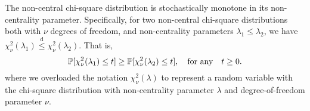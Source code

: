 \begin{lemma} \label{lemma:stochastic-monotonicity}
The non-central chi-square distribution is stochastically monotone in its non-centrality parameter.
Specifically, for two non-central chi-square distributions both with $\nu$ degrees of freedom, and non-centrality parameters $\lambda_1 \le \lambda_2$, we have $\chi^2_\nu(\lambda_1) \stackrel{\mathrm{d}}{\le} \chi^2_\nu(\lambda_2)$. 
That is,
\begin{equation} \label{eq:stochastic-monotonicity}
    \P[\chi^2_\nu(\lambda_1) \le t] \ge \P[\chi^2_\nu(\lambda_2) \le t], \quad \text{for any}\quad t\ge0.
\end{equation}
where we overloaded the notation $\chi_\nu^2(\lambda)$ to represent a random variable with the chi-square distribution with non-centrality parameter $\lambda$ and degree-of-freedom parameter $\nu$.
\end{lemma}

